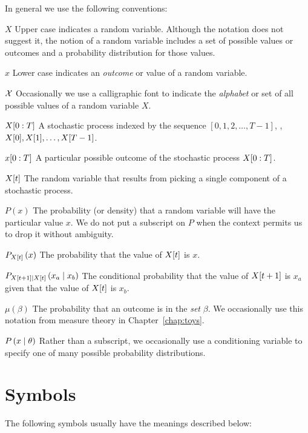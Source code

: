 \documentclass[ltxbook, commentsvisible]{hmmdsbook}
\begin{document}
{  In general we use the following conventions:
  \begin{symbdescription}
  \item[$X$] Upper case indicates a random variable.  Although the
    notation does not suggest it, the notion of a random variable
    includes a set of possible values or outcomes and a probability
    distribution for those values.
  \item[$x$] Lower case indicates an \emph{outcome} or value of a
    random variable.
  \item[${\cal X}$] Occasionally we use a calligraphic font to
    indicate the \emph{alphabet} or set of all possible values of a
    random variable $X$.
  \item[$X[0:T]$] A stochastic process indexed by the sequence
    $[0,1,2,\ldots,T-1]$, \ie,\\
    ${X}{[0]},{X}{[1]}, \ldots, {X}{[T-1]}$.
  \item[$x[0:T]$] A particular possible outcome of the stochastic
    process $X[0:T]$.
  \item[${X}{[t]}$] The random variable that results from picking a
    single component of a stochastic process.
  \item[$P(x)$] The probability (or density) that a random variable
    will have the particular value $x$.  We do not put a subscript on
    $P$ when the context permits us to drop it without ambiguity.
  \item[$P_{{X}{[t]}} \left(x \right)$] The probability that the
    value of ${X}{[t]}$ is $x$.
  \item[$P_{{X}{[t+1]}\mid {X}{[t]}} \left(x_a\mid x_b \right)$] The
    conditional probability that the value of ${X}{[t+1]}$ is $x_a$
    given that the value of ${X}{[t]}$ is $x_b$.
  \item[$\mu(\beta)$] The probability that an outcome is in the
    \emph{set} $\beta$.  We occasionally use this notation from
    measure theory in Chapter~\ref{chap:toys}.
  \item[$P \left(x\mid \theta \right)$] Rather than a subscript, we
    occasionally use a conditioning variable to specify one of many
    possible probability distributions.
 \end{symbdescription}

  \section*{Symbols}
  The following symbols usually have the meanings described below:
}
\cleardoublepage%
\markboth{\nomname}{\nomname}%
\printnomenclature
\end{document}
